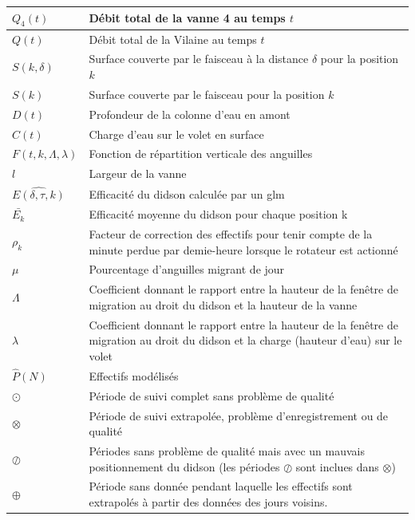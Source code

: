 \documentclass[11pt,twocolumn,titlepage,twoside]{article}
\begin{document}
\begin{table}[htp] 
\centering 
  \begin{tabular}{|l | p{6cm}|} 
  \hline     
      $Q_4(t)$ & Débit total de la vanne 4 au temps $t$\\ \hline
      $Q(t)$ & Débit total de la Vilaine au temps $t$\\ \hline 
      $S(k,\delta)$ & Surface couverte par le faisceau à la distance $\delta$
     pour la position $k$\\ \hline
      $S(k)$ & Surface couverte par le faisceau pour la position $k$\\ \hline
      $D(t)$ & Profondeur de la colonne d'eau en amont\\ \hline
      $C(t)$ & Charge d'eau sur le volet en surface\\ \hline
      $F(t,k,\Lambda,\lambda)$ & Fonction de répartition verticale des
     anguilles\\ \hline
       $l$ & Largeur de la vanne\\ \hline
      $\widehat{E(\delta,\tau,k)}$ & Efficacité du didson calculée par un
     glm\\ \hline
      $\bar{E_k}$ & Efficacité moyenne du didson pour chaque position k\\ \hline
      $\rho_k$ & Facteur de correction des effectifs pour tenir compte de la
     minute perdue par demie-heure lorsque le rotateur est actionné\\ \hline
      $\mu$ & Pourcentage d'anguilles migrant de jour\\ \hline
      $\Lambda$ & Coefficient donnant le rapport entre la hauteur de la fenêtre
     de migration au droit du didson et la hauteur de la vanne\\ \hline
      $\lambda$ & Coefficient donnant le rapport entre la hauteur de la fenêtre
     de migration au droit du didson et la charge (hauteur d'eau) sur le volet\\ \hline
      $\hat{P}(N)$ & Effectifs modélisés\\ \hline
      $\odot$ & Période de suivi complet sans problème de qualité\\ \hline
      $\otimes$ & Période de suivi extrapolée, problème d'enregistrement
        ou de qualité\\ \hline
      $\oslash$ & Périodes sans problème de qualité mais avec un mauvais
        positionnement du didson (les périodes $\oslash$ sont inclues dans
        $\otimes$)\\ \hline
     $\oplus$ & Période sans donnée pendant laquelle les effectifs sont
     extrapolés à partir des données des jours voisins.\\
     \hline
     \end{tabular} 
\end{table} 
\end{document}
